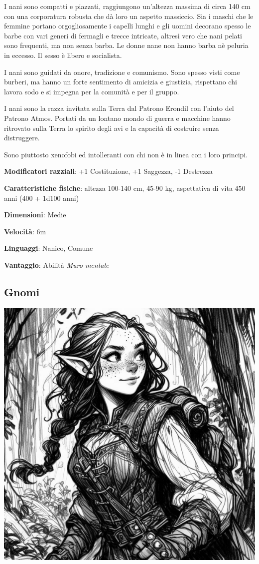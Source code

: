 \begin{multicols}{2}
I nani sono compatti e piazzati, raggiungono un'altezza massima di circa 140 cm con una corporatura robusta che dà loro un aspetto massiccio. Sia i maschi che le femmine portano orgogliosamente i capelli lunghi e gli uomini decorano spesso le barbe con vari generi di fermagli e trecce intricate, altresì vero che nani pelati sono frequenti, ma non senza barba. Le donne nane non hanno barba nè peluria in eccesso. Il sesso è libero e socialista.

I nani sono guidati da onore, tradizione e comunismo. Sono spesso visti come burberi, ma hanno un forte sentimento di amicizia e giustizia, rispettano chi lavora sodo e si impegna per la comunità e per il gruppo.

I nani sono la razza invitata sulla Terra dal Patrono Erondil con l'aiuto del Patrono Atmos. Portati da un lontano mondo di guerra e macchine hanno ritrovato sulla Terra lo spirito degli avi e la capacità di costruire senza distruggere.

Sono piuttosto xenofobi ed intolleranti con chi non è in linea con i loro principi.

\textbf{Modificatori razziali}: +1 Costituzione, +1 Saggezza, -1 Destrezza

\textbf{Caratteristiche fisiche}: altezza 100-140 cm, 45-90 kg, aspettativa di vita 450 anni (400 + 1d100 anni)

\textbf{Dimensioni}: Medie

\textbf{Velocità}: 6m

\textbf{Linguaggi}: Nanico, Comune

\textbf{Vantaggio}: Abilità \emph{Muro mentale}

\subsection{Gnomi}\label{gnomi}

\begin{center}
\includegraphics[height=0.7\linewidth]{immagini/gnoma-ai.png}


\end{center}
\end{multicols}
